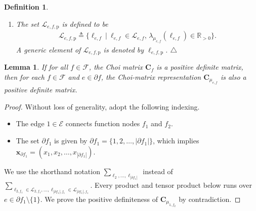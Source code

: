 \documentclass[journal]{IEEEtran}
\newcommand{\add}[1]{{\color{black}#1}}
\newtheorem{lemma}[theorem]{Lemma}
\newtheorem{definition}[theorem]{Definition}
\newcommand{\manualendsymbol}[1]{%
  \leavevmode\unskip\penalty9999\hbox{}\nobreak\hfill
  \quad\hbox{#1}}
\newcommand{\edefinition}{\manualendsymbol{\ensuremath{\triangle}}}
\newcommand{\vect}[1]{ \bm{#1} }
\newcommand{\set}[1]{\mathcal{#1}}
\newcommand{\setEfull}{ \mathcal{E} }
\newcommand{\setF}{ \mathcal{F} }
\newcommand{\setpf}{ \partial f }
\newcommand{\sR}{\mathbb{R}}
\newcommand{\vx}{ \vect{x} }
\newcommand{\defeq}{ \triangleq }
\newcommand{\etof}{ e,f }
\newcommand{\matr}[1]{\vect{#1}}
\newcommand{\onetoftwo}{ 1, f_2 }
\begin{document}
\begin{appendices}
\begin{definition}
\begin{enumerate}
      \item The set $ \set{L}_{e,f,\mathrm{p}} $ is defined to be
            \begin{align}
              \set{L}_{e,f,\mathrm{p}}
              \defeq \bigl\{ \ell_{e,f} \ \bigl| \
              \ell_{e,f} \in \set{L}_{e,f},\,
              \lambda_{ \mu_{\etof} }( \ell_{e,f} )
              \in \sR_{>0} \bigr\}.  \label{eqn: property of ell e p}
            \end{align}
            A generic element of $ \set{L}_{e,f,\mathrm{p}} $ is denoted by
            $ \ell_{e,f,\mathrm{p}} $.\edefinition
    \end{enumerate}
  \end{definition}

  \begin{lemma}
    \label{lem: positive of message}
    If for all $ f \in \setF $, the Choi matrix
    $ \matr{C}_{f} $ is a positive definite matrix,
    then for each $ f \in \setF $ and $ e \in \setpf $, the Choi-matrix representation
    $\matr{C}_{\mu_{\etof}}$ is also a positive definite matrix.
  \end{lemma}
  \begin{proof}
    \add{Without loss of generality, adopt the following indexing.}
    \begin{itemize}
      \item The edge $ 1 \in \setEfull $ connects function nodes $ f_{1} $ and $ f_{2} $.

      \item The set $ \setpf_{1} $ is given by
            $ \setpf_{1} = \{1,2,\ldots,|\setpf_{1}|\} $, which implies
            $ \vx_{\setpf_{1}} = ( x_{1}, x_{2},\ldots,x_{|\setpf_{1}|} ) $.

    \end{itemize}
    \add{We use the shorthand notation}
    $ \sum_{ \ell_{2},\ldots,\ell_{|\setpf_{1}|} } $ \add{instead of}
    $ \sum_{ \ell_{2,f_1} \in \set{L}_{2,f_1}, \ldots,\ell_{|\setpf_{1}|,f_1}
        \in \set{L}_{|\setpf_1|,f_1} } $. \add{Every product and tensor product
      below runs over $e \in \setpf_{1}\setminus\{1\}$. We prove the positive
      definiteness of $ \matr{C}_{\mu_{\onetoftwo}} $ by contradiction.}


\end{proof}
\end{appendices}
\end{document}
